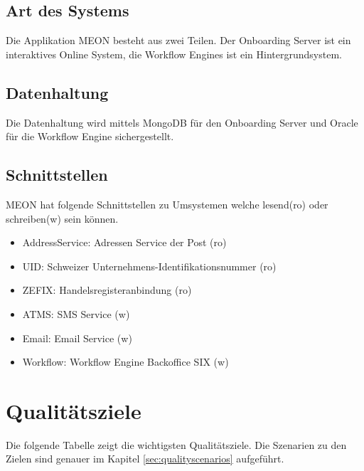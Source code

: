\subsection{Art des Systems}

Die Applikation MEON besteht aus zwei Teilen. Der Onboarding Server ist ein interaktives Online System, die Workflow Engines ist ein Hintergrundsystem.

\subsection{Datenhaltung}

Die Datenhaltung wird mittels MongoDB für den Onboarding Server und Oracle für die Workflow Engine sichergestellt.
\newpage
\subsection{Schnittstellen}

MEON hat folgende Schnittstellen zu Umsystemen welche lesend(ro) oder schreiben(w) sein können.
\begin{itemize}
	\item AddressService: Adressen Service der Post (ro)
	\item UID: Schweizer Unternehmens-Identifikationsnummer (ro) 
	\item ZEFIX: Handelsregisteranbindung (ro)
	\item ATMS: SMS Service (w)
	\item Email: Email Service (w)
	\item Workflow: Workflow Engine Backoffice SIX (w)
\end{itemize}

\section{Qualitätsziele}

Die folgende Tabelle zeigt die wichtigsten Qualitätsziele. Die Szenarien zu den Zielen sind genauer im Kapitel \ref{sec:qualityscenarios} aufgeführt.

